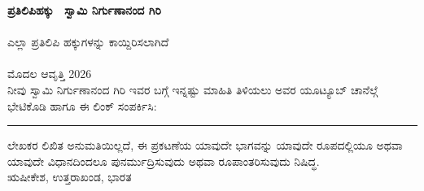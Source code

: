 \thispagestyle{empty}
\textbf{\large ಪ್ರತಿಲಿಪಿಹಕ್ಕು \textcopyright\ ಸ್ವಾಮಿ ನಿರ್ಗುಣಾನಂದ ಗಿರಿ}\\
\\
ಎಲ್ಲಾ ಪ್ರತಿಲಿಪಿ ಹಕ್ಕುಗಳನ್ನು ಕಾಯ್ದಿರಿಸಲಾಗಿದೆ\\
\\
ಮೊದಲ ಆವೃತ್ತಿ 2026\\

\vspace*{2cm}
{{\footnotesize ನೀವು ಸ್ವಾಮಿ ನಿರ್ಗುಣಾನಂದ ಗಿರಿ ಇವರ ಬಗ್ಗೆ ಇನ್ನಷ್ಟು ಮಾಹಿತಿ ತಿಳಿಯಲು  ಅವರ ಯೂಟ್ಯೂಬ್ ಚಾನೆಲ್ಗೆ ಭೇಟಿಕೊಡಿ ಹಾಗೂ ಈ ಲಿಂಕ್ ಸಂಪರ್ಕಿಸಿ:} \textbf{}}


\vfill
\rule{\textwidth}{2pt}
{\footnotesize {\cpRightInfoColor ಲೇಖಕರ ಲಿಖಿತ ಅನುಮತಿಯಿಲ್ಲದೆ, ಈ ಪ್ರಕಟಣೆಯ ಯಾವುದೇ ಭಾಗವನ್ನು ಯಾವುದೇ ರೂಪದಲ್ಲಿಯೂ ಅಥವಾ ಯಾವುದೇ ವಿಧಾನದಿಂದಲೂ ಪುನರ್ಮುದ್ರಿಸುವುದು ಅಥವಾ ರೂಪಾಂತರಿಸುವುದು ನಿಷಿದ್ಧ.}\\

ಋಷೀಕೇಶ, ಉತ್ತರಾಖಂಡ, ಭಾರತ 
\\}
\newpage